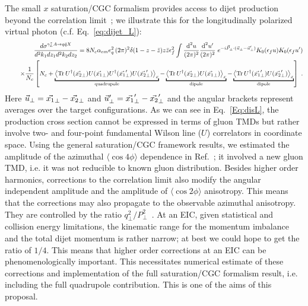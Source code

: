 { 
	The small $x$ saturation/CGC formalism provides access to dijet production beyond the
	correlation limit~\cite{Dominguez:2011wm}; we illustrate this for the longitudinally 
	polarized virtual photon (c.f. Eq.~\eqref{eq:dijet_L}): 
	\begin{eqnarray}
&&\frac{d\sigma ^{\gamma_{L}^{\ast }A\rightarrow q\bar{q}X}}{d^2k_1dz_1d^2k_2dz_2}
= 8N_{c}\alpha _{em}e_{q}^{2} \, (2\pi)^2 \delta(1 -z- \bar{z}) 
z \bar{z} \epsilon_f^2
\int \frac{\text{d}^{2}u}{(2\pi)^{2}}\frac{\text{d}^{2}u^{\prime }}{(2\pi )^{2}}
\; e^{-i \v{P}\cdot(\v{u}-\v{u}^{\prime})}
 K_0(\epsilon_f u )   K_0(\epsilon_f u^\prime)  \\
&&~~~~\times 
\frac{1}{N_c}\left[
N_c+
\underbracket{
\left< {\rm Tr}\,
U^\dagger(\v{x_2})  U(\v{x_1}) U^\dagger(\v{x_1}^{\prime})  U(\v{x_2}^{\prime})
\right>_x}_{\rm quadrupole} 
-
\underbracket{\left< {\rm Tr}\,
U^\dagger(\v{x_2})  U(\v{x_1}) \right>_x}_{\rm dipole}
-
\underbracket{
\left< {\rm Tr}\,
U^\dagger(\v{x_1}^\prime)  U(\v{x_2}^\prime) \right>_x }_{\rm dipole}
\right] ~.  \label{Eq:disL} \notag
\end{eqnarray}
Here $ \vec {u}_\perp = \vec {x_1}_\perp - \vec {x_2}_\perp $ and $ \vec {u}_\perp ^\prime= \vec {x_1}_\perp ^\prime- \vec {x_2}_\perp ^\prime$ and the angular brackets  represent averages over the 
target configurations. 
As we can see in Eq.~\eqref{Eq:disL},  the production cross section cannot be expressed in terms of  
	gluon TMDs but rather involve two- and four-point fundamental Wilson line ($U$) correlators  in coordinate space. 
	Using the general saturation/CGC framework results,  we 
	estimated the amplitude of the azimuthal $\langle \cos 4\phi  \rangle$
	dependence in Ref.~\cite{Dumitru:2016jku}; it involved a new gluon TMD, i.e. it was not reducible to known gluon distribution. 
	Besides higher order harmonics, corrections to the correlation limit also 
	modify the angular independent amplitude and the amplitude of $\langle \cos 2\phi  \rangle$ anisotropy.
	This means that the corrections may also propagate to the observable azimuthal anisotropy.  
	They are controlled by the ratio $q_\perp^2/P_\perp^2$~\cite{Dumitru:2016jku}.    
	At an EIC, given statistical and collision energy limitations,  the kinematic range for the momentum imbalance and the 
	total dijet momentum is rather narrow; at best we could hope to get the ratio of $1/4$.
	This means that higher order corrections at an EIC can be phenomenologically important. 
	This necessitates numerical estimate of these corrections and implementation of the 
	full saturation/CGC formalism result, i.e. including the   full quadrupole contribution.   
	This is one of the aims of this proposal. 
	}




